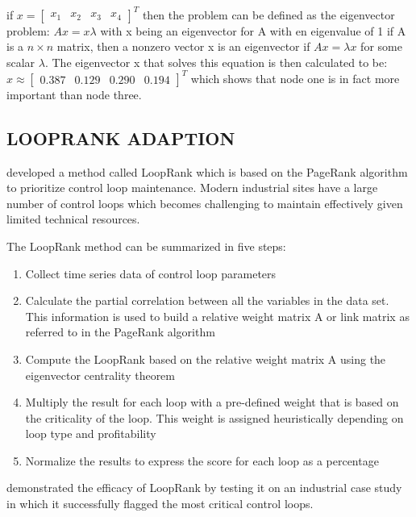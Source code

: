if $x = \begin{bmatrix} x_{1} & x_{2} & x_{3} & x_{4} \end{bmatrix} ^{T}$ then the problem can be defined as the eigenvector problem:
\newline $Ax = x \lambda$ 
\newline with x being an eigenvector for A with en eigenvalue of 1
\newline if A is a $n\times n$ matrix, then a nonzero vector x is an eigenvector if $Ax = \lambda x$ for some scalar $\lambda$. The eigenvector x that solves this equation is then calculated to be:
\newline $x \approx \begin{bmatrix} 0.387 & 0.129 & 0.290 & 0.194\end{bmatrix}^{T}$
which shows that node one is in fact more important than node three.

\subsection{LOOPRANK ADAPTION}

\cite{farenzena2009looprank} developed a method called LoopRank which is based on the PageRank algorithm to prioritize control loop maintenance. Modern industrial sites have a large number of control loops which becomes challenging to maintain effectively given limited technical resources. 

The LoopRank method can be summarized in five steps:
\begin{enumerate}
	\item Collect time series data of control loop parameters
	\item Calculate the partial correlation between all the variables in the data set. This information is used to build a relative weight matrix A or link matrix as referred to in the PageRank algorithm
	\item Compute the LoopRank based on the relative weight matrix A using the eigenvector centrality theorem
	\item Multiply the result for each loop with a pre-defined weight that is based on the criticality of the loop. This weight is assigned heuristically depending on loop type and profitability
	\item Normalize the results to express the score for each loop as a percentage
\end{enumerate}

\cite{farenzena2009looprank} demonstrated the efficacy of LoopRank by testing it on an industrial case study in which it successfully flagged the most critical control loops.

